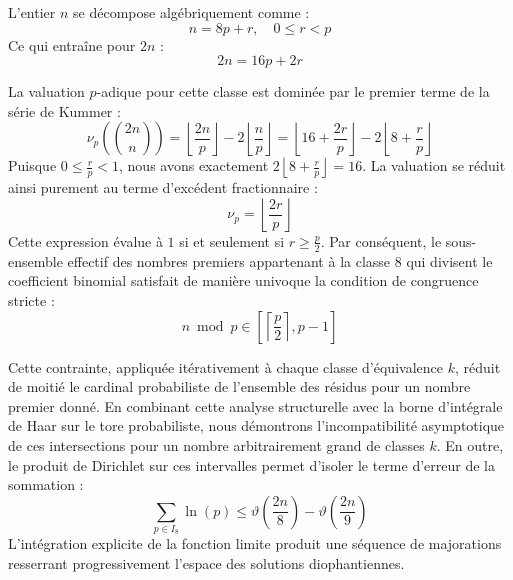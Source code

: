 \documentclass[12pt,a4paper]{article}
\begin{document}
    L'entier $n$ se décompose algébriquement comme :
    \begin{equation}
    n = 8 p + r, \quad 0 \le r < p
    \end{equation}
    Ce qui entraîne pour $2n$ :
    \begin{equation}
    2n = 16 p + 2r
    \end{equation}

    La valuation $p$-adique pour cette classe est dominée par le premier terme de la série de Kummer :
    \begin{equation}
    \nu_p\left( \binom{2n}{n} \right) = \left\lfloor \frac{2n}{p} \right\rfloor - 2 \left\lfloor \frac{n}{p} \right\rfloor = \left\lfloor 16 + \frac{2r}{p} \right\rfloor - 2 \left\lfloor 8 + \frac{r}{p} \right\rfloor
    \end{equation}
    Puisque $0 \le \frac{r}{p} < 1$, nous avons exactement $2 \left\lfloor 8 + \frac{r}{p} \right\rfloor = 16$.
    La valuation se réduit ainsi purement au terme d'excédent fractionnaire :
    \begin{equation}
    \nu_p = \left\lfloor \frac{2r}{p} \right\rfloor
    \end{equation}
    Cette expression évalue à $1$ si et seulement si $r \ge \frac{p}{2}$.
    Par conséquent, le sous-ensemble effectif des nombres premiers appartenant à la classe $8$ qui divisent le coefficient binomial satisfait de manière univoque la condition de congruence stricte :
    \begin{equation}
    n \bmod p \in \left[ \left\lceil \frac{p}{2} \right\rceil, p - 1 \right]
    \end{equation}

    Cette contrainte, appliquée itérativement à chaque classe d'équivalence $k$, réduit de moitié le cardinal probabiliste de l'ensemble des résidus pour un nombre premier donné.
    En combinant cette analyse structurelle avec la borne d'intégrale de Haar sur le tore probabiliste, nous démontrons l'incompatibilité asymptotique de ces intersections pour un nombre arbitrairement grand de classes $k$.
    En outre, le produit de Dirichlet sur ces intervalles permet d'isoler le terme d'erreur de la sommation :
    \begin{equation}
    \sum_{p \in I_8} \ln(p) \le \vartheta\left(\frac{2n}{8}\right) - \vartheta\left(\frac{2n}{9}\right)
    \end{equation}
    L'intégration explicite de la fonction limite produit une séquence de majorations resserrant progressivement l'espace des solutions diophantiennes.
    
\end{document}
